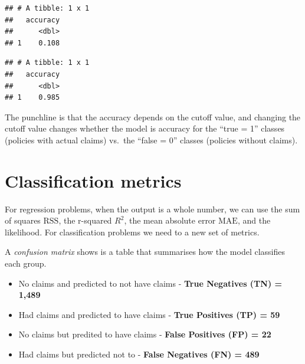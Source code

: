 \documentclass[openany]{book}
\newenvironment{Shaded}{\begin{snugshade}}{\end{snugshade}}
\newcommand{\DataTypeTok}[1]{\textcolor[rgb]{0.13,0.29,0.53}{#1}}
\newcommand{\DecValTok}[1]{\textcolor[rgb]{0.00,0.00,0.81}{#1}}
\newcommand{\KeywordTok}[1]{\textcolor[rgb]{0.13,0.29,0.53}{\textbf{#1}}}
\newcommand{\NormalTok}[1]{#1}
\newcommand{\OperatorTok}[1]{\textcolor[rgb]{0.81,0.36,0.00}{\textbf{#1}}}
\newcommand{\StringTok}[1]{\textcolor[rgb]{0.31,0.60,0.02}{#1}}
\providecommand{\tightlist}{%
  \setlength{\itemsep}{0pt}\setlength{\parskip}{0pt}}
\begin{document}
\begin{verbatim}
## # A tibble: 1 x 1
##   accuracy
##      <dbl>
## 1    0.108
\end{verbatim}

\begin{Shaded}
\end{Shaded}

\begin{verbatim}
## # A tibble: 1 x 1
##   accuracy
##      <dbl>
## 1    0.985
\end{verbatim}

The punchline is that the accuracy depends on the cutoff value, and changing the cutoff value changes whether the model is accuracy for the ``true = 1'' classes (policies with actual claims) vs.~the ``false = 0'' classes (policies without claims).

\hypertarget{classification-metrics}{%
\chapter{Classification metrics}\label{classification-metrics}}

For regression problems, when the output is a whole number, we can use the sum of squares \(\text{RSS}\), the r-squared \(R^2\), the mean absolute error \(\text{MAE}\), and the likelihood. For classification problems we need to a new set of metrics.

A \emph{confusion matrix} shows is a table that summarises how the model classifies each group.

\begin{itemize}
\tightlist
\item
  No claims and predicted to not have claims - \textbf{True Negatives (TN) = 1,489}
\item
  Had claims and predicted to have claims - \textbf{True Positives (TP) = 59}
\item
  No claims but predited to have claims - \textbf{False Positives (FP) = 22}
\item
  Had claims but predicted not to - \textbf{False Negatives (FN) = 489}
\end{itemize}
\end{document}

